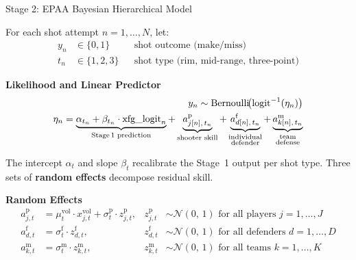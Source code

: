 \documentclass[final]{beamer}
\newlength{\onecolwid}
\begin{document}
\begin{frame}[t]
\begin{columns}[t]
\begin{column}{\onecolwid}

\begin{block}{Stage 2: EPAA Bayesian Hierarchical Model}

For each shot attempt $n = 1, \dots, N$, let:
\[
\begin{aligned}
  y_n &\in \{0,1\} & &\text{shot outcome (make/miss)} \\
  t_n &\in \{1,2,3\} & &\text{shot type (rim, mid-range, three-point)}
\end{aligned}
\]

\vspace{1ex}

\textbf{Likelihood and Linear Predictor}
\[
\begin{aligned}
  y_n \sim \mathrm{Bernoulli}\!\bigl(\mathrm{logit}^{-1}(\eta_n)\bigr) \\
  \eta_n = \underbrace{\alpha_{t_n}
    + \beta_{t_n} \cdot \mathrm{xfg\_logit}_n
    }_{\text{Stage\,1 prediction}}
    + \underbrace{a^{\mathrm{p}}_{j[n],\,t_n}
    }_{\text{shooter skill}}
    + \underbrace{a^{\mathrm{f}}_{d[n],\,t_n}
    }_{\substack{\text{individual} \\ \text{defender}}}
    + \underbrace{a^{\mathrm{m}}_{k[n],\,t_n}
    }_{\substack{\text{team} \\ \text{defense}}}
\end{aligned}
\]

The intercept $\alpha_t$ and slope $\beta_t$ recalibrate the Stage~1 output per shot type. Three sets of \textbf{random effects} decompose residual skill.

\vspace{1ex}

\textbf{Random Effects}
\[
\begin{aligned}
  a^{\mathrm{p}}_{j,t} &= \mu^{\mathrm{vol}}_t
    \cdot x^{\mathrm{vol}}_{j,t}
    + \sigma^{\mathrm{p}}_t \cdot z^{\mathrm{p}}_{j,t},
    &z^{\mathrm{p}}_{j,t}
    &\sim \mathcal{N}(0,\, 1) \text{ for all players } j = 1,\dots,J \\[4pt]
  a^{\mathrm{f}}_{d,t}
    &= \sigma^{\mathrm{f}}_t
    \cdot z^{\mathrm{f}}_{d,t},
    &z^{\mathrm{f}}_{d,t}
    &\sim \mathcal{N}(0,\, 1) \text{ for all defenders } d = 1,\dots,D  \\[4pt]
  a^{\mathrm{m}}_{k,t}
    &= \sigma^{\mathrm{m}}_t
    \cdot z^{\mathrm{m}}_{k,t},
    &z^{\mathrm{m}}_{k,t}
    &\sim \mathcal{N}(0,\, 1) \text{ for all teams } k = 1,\dots,K 
\end{aligned}
\]


\end{block}
\end{column}
\end{columns}
\end{frame}
\end{document}
